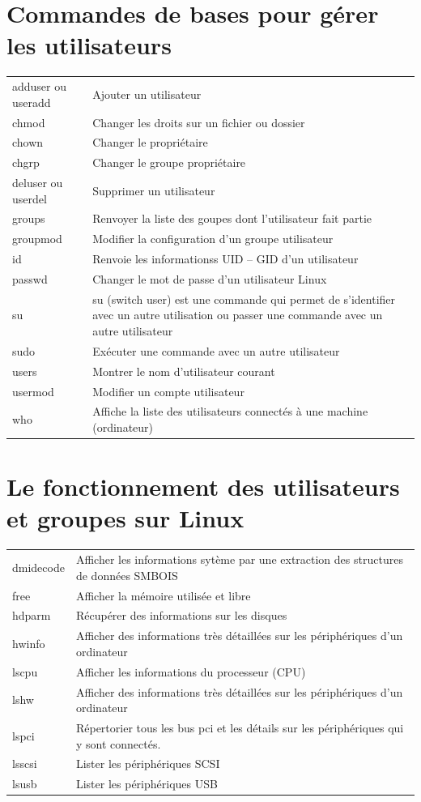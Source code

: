 \documentclass[a4paper, 11pt, french, oneside]{book}
\begin{document}
		\section{Commandes de bases pour gérer les utilisateurs}
		    \begin{tabular}{p{4cm}|p{9cm}}
				adduser ou useradd	& Ajouter un utilisateur\\
				chmod	& Changer les droits sur un fichier ou dossier\\
				chown	& Changer le propriétaire\\
				chgrp	& Changer le groupe propriétaire\\
				deluser ou userdel	& Supprimer un utilisateur\\
				groups	& Renvoyer la liste des goupes dont l’utilisateur fait partie\\
				groupmod	& Modifier la configuration d’un groupe utilisateur\\
				id	& Renvoie les informationss UID – GID d’un utilisateur\\
				passwd	& Changer le mot de passe d’un utilisateur Linux\\
				su	& su (switch user) est une commande qui permet de s’identifier
				avec un autre utilisation ou passer une commande avec un autre utilisateur\\
				sudo	& Exécuter une commande avec un autre utilisateur\\
				users	& Montrer le nom d’utilisateur courant\\
				usermod	& Modifier un compte utilisateur\\
				who	& Affiche la liste des utilisateurs connectés à une machine (ordinateur)\\
		    \end{tabular}
	    \section{Le fonctionnement des utilisateurs et groupes sur Linux}
	        \begin{tabular}{p{3cm}|p{11cm}}
	    	    dmidecode	& Afficher les informations sytème par une extraction des structures de données SMBOIS\\
				free	& Afficher la mémoire utilisée et libre\\
				hdparm	& Récupérer des informations sur les disques\\
				hwinfo	& Afficher des informations très détaillées sur les périphériques d’un ordinateur\\
				lscpu	& Afficher les informations du processeur (CPU)\\
				lshw	& Afficher des informations très détaillées sur les périphériques d’un ordinateur\\
				lspci	& Répertorier tous les bus pci et les détails sur les périphériques qui y sont connectés.\\
				lsscsi	& Lister les périphériques SCSI\\
				lsusb	& Lister les périphériques USB\\
		    \end{tabular}
\end{document}

